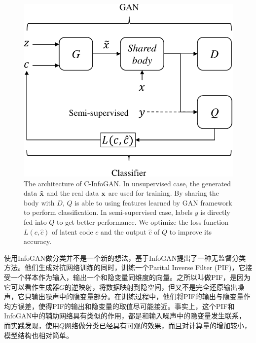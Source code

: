 \begin{figure}[htbp]
  \centering
  \includegraphics[width=\onef\textwidth]{Img/arch-cinfogan.pdf} 
  {The architecture of C-InfoGAN. In unsupervised case, the generated data $\tilde{\mathbf{x}}$ and the real data $\mathbf{x}$ are used for training. By sharing the body with $D$, $Q$ is able to using features learned by GAN framework to perform classification. In semi-supervised case, labels $y$ is directly fed into $Q$ to get better performance. We optimize the loss function $L(c, \hat{c})$ of latent code $c$ and the output $\hat{c}$ of $Q$ to improve its accuracy.}
  \label{fig:c-infogan}
\end{figure}

使用InfoGAN做分类并不是一个新的想法，\citet{zhang2018cramer}基于InfoGAN提出了一种无监督分类方法。他们生成对抗网络训练的同时，训练一个Parital Inverse Filter (PIF)，它接受一个样本作为输入，输出一个和隐变量同维度的向量。之所以叫做PIF，是因为它可以看作生成器$G$的逆映射，将数据映射到隐空间，但又不是完全还原输出噪声，它只输出噪声中的隐变量部分。在训练过程中，他们将PIF的输出与隐变量作均方误差，使得PIF的输出和隐变量的取值尽可能接近。事实上，这个PIF和InfoGAN中的辅助网络具有类似的作用，都是和输入噪声中的隐变量发生联系，而实践发现，使用$Q$网络做分类已经具有可观的效果，而且对计算量的增加较小，模型结构也相对简单。


